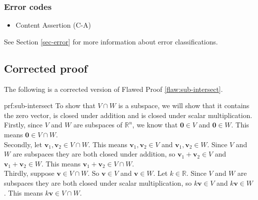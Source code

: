 \subsubsection{Error codes}
\begin{itemize}
	\item 	Content Assertion (C-A)
\end{itemize}
See Section \ref{sec-error} for more information about error classifications.

\clearpage
\subsection{Corrected proof}

The following is a corrected version of Flawed Proof \ref{flaw:sub-intersect}. %

\begin{prf}{prf:sub-intersect} %
To show that $V\cap W$ is a subspace, we will show that it contains the zero vector, is closed under addition and is closed under scalar multiplication. \\

Firstly, since $V$ and $W$ are subspaces of $\mathbb{R}^n$, we know that $\bm{0} \in V$ and $\bm{0} \in W$. This means $\bm{0} \in V \cap W$. \\

Secondly, let $\bm{v}_1, \bm{v}_2 \in V \cap W$. This means $\bm{v}_1, \bm{v}_2 \in V$ and $\bm{v}_1, \bm{v}_2 \in W$. Since $V$ and $W$ are subspaces they are both closed under addition, so $\bm{v}_1 + \bm{v}_2 \in V$ and $\bm{v}_1 + \bm{v}_2 \in W$. This means $\bm{v}_1 + \bm{v}_2 \in V \cap W$. \\

Thirdly, suppose $\bm{v} \in V \cap W$. So $\bm{v} \in V$ and $\bm{v} \in W$. Let $k \in \mathbb{R}$. Since $V$ and $W$ are subspaces they are both closed under scalar multiplication, so $k\bm{v} \in V$ and $k\bm{v} \in W$. This means $k\bm{v} \in V \cap W$.
\end{prf} 